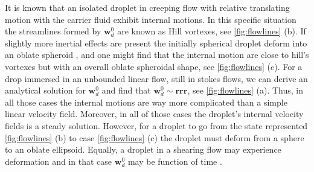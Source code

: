 It is known that an isolated droplet in creeping flow with relative translating motion with the carrier fluid exhibit internal motions. In this specific situation the streamlines formed by $\textbf{w}_d^0$ are known as Hill vortexes, see \ref{fig:flowlines} (b). 
If slightly more inertial effects are present the initially spherical droplet deform into an oblate spheroid \citep{taylor1964deformation}, and one might find that the internal motion are close to hill's vortexes but with an overall oblate spheroidal shape, see \ref{fig:flowlines} (c). 
For a drop immersed in an unbounded linear flow, still in stokes flows, we can derive an analytical solution for $\textbf{w}_d^0$ and find that $\textbf{w}_d^0 \sim \textbf{rrr}$, see \ref{fig:flowlines} (a). 
Thus, in all those cases the internal motions are way more complicated than a simple linear velocity field. 
Moreover, in all of those cases the droplet's internal velocity fields is a steady solution.
However, for a droplet to go from the state represented \ref{fig:flowlines} (b) to case \ref{fig:flowlines} (c) the droplet must deform from a sphere to an oblate ellipsoid. 
Equally, a droplet in a shearing flow may experience deformation and in that case $\textbf{w}_d^0$ may be function of time \citet[chapter 7]{leal2007advanced}.
